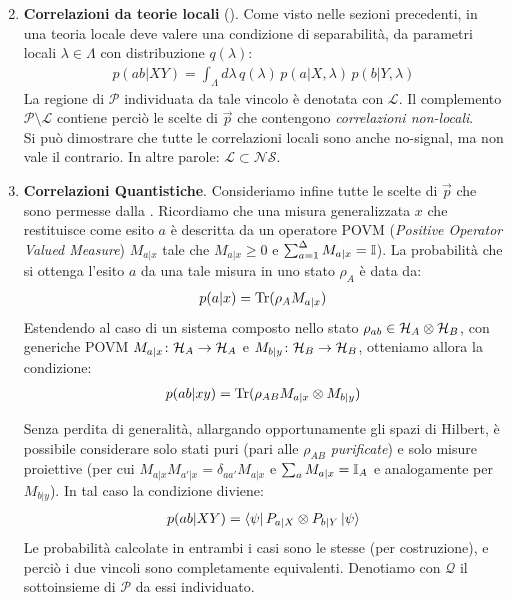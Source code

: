 \documentclass[../../InformazioneQuantistica.tex]{subfiles}
\begin{document}
\begin{enumerate}
\setcounter{enumi}{1}
\item \textbf{Correlazioni da teorie locali} (). Come visto nelle sezioni precedenti, in una teoria locale deve valere una condizione di separabilità,  da parametri locali $\lambda \in \Lambda$ con distribuzione $q(\lambda)$:
\begin{align*}
p(ab|XY) = \int_\Lambda d\lambda\, q(\lambda)\, p(a|X,\lambda)\,p(b|Y, \lambda)
\end{align*}
La regione di $\mathcal{P}$ individuata da tale vincolo è denotata con $\mathcal{L}$. Il complemento $\mathcal{P}\setminus \mathcal{L}$ contiene perciò le scelte di $\vec{p}$ che contengono \textit{correlazioni non-locali}.\\
Si può dimostrare che tutte le correlazioni locali sono anche no-signal, ma non vale il contrario. In altre parole: $\mathcal{L} \subset \mathcal{NS}$.

\item \textbf{Correlazioni Quantistiche}. Consideriamo infine tutte le scelte di $\vec{p}$ che sono permesse dalla \MQ. Ricordiamo che una misura generalizzata $x$ che restituisce come esito $a$ è descritta da un operatore POVM (\textit{Positive Operator Valued Measure}) $M_{a|x}$ tale che $M_{a|x}\geq 0$ e $\sum_{a=1}^\Delta M_{a|x} = \mathbb{I}$). La probabilità che si ottenga l'esito $a$ da una tale misura in uno stato $\rho_A$ è data da:
\begin{align*}
p(a|x) = \operatorname{Tr}(\rho_A M_{a|x})
\end{align*}
Estendendo al caso di un sistema composto nello stato $\rho_{ab} \in \mathcal{H}_A \otimes \mathcal{H}_B$, con generiche POVM $M_{a|x}\colon \mathcal{H}_A \to \mathcal{H}_A$ e $M_{b|y}\colon \mathcal{H}_B\to\mathcal{H}_B$, otteniamo allora la condizione:
\begin{align*}
p(ab|xy) = \operatorname{Tr}(\rho_{AB} M_{a|x} \otimes M_{b|y})
\end{align*}

Senza perdita di generalità, allargando opportunamente gli spazi di Hilbert, è possibile considerare solo stati puri (pari alle $\rho_{AB}$ \textit{purificate}) e solo misure proiettive (per cui $M_{a|x}M_{a'|x} = \delta_{aa'} M_{a|x}$ e $\sum_a M_{a|x} = \mathbb{I}_A$ e analogamente per $M_{b|y}$). In tal caso la condizione diviene:
\begin{align*}
p(ab|XY) = \Bra{\psi}P_{a|X}\otimes P_{b|Y}\Ket{\psi}
\end{align*}
Le probabilità calcolate in entrambi i casi sono le stesse (per costruzione), e perciò i due vincoli sono completamente equivalenti. Denotiamo con $\mathcal{Q}$ il sottoinsieme di $\mathcal{P}$ da essi individuato.



\end{enumerate}
\end{document}
